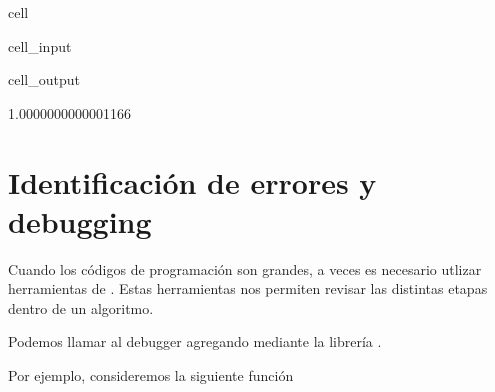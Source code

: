 \documentclass[letterpaper,10pt,english]{jupyterBook}
\begin{document}
\begin{sphinxuseclass}{cell}\begin{sphinxVerbatimInput}

\begin{sphinxuseclass}{cell_input}
\begin{sphinxVerbatim}[commandchars=\\\{\}]
 
\end{sphinxVerbatim}

\end{sphinxuseclass}\end{sphinxVerbatimInput}
\begin{sphinxVerbatimOutput}

\begin{sphinxuseclass}{cell_output}
\begin{sphinxVerbatim}[commandchars=\\\{\}]
1.0000000000001166
\end{sphinxVerbatim}

\end{sphinxuseclass}\end{sphinxVerbatimOutput}

\end{sphinxuseclass}

\section{Identificación de errores y debugging}
\label{\detokenize{1.1-Aspectos_generales/1.1-Aspectos_generales:identificacion-de-errores-y-debugging}}
\sphinxAtStartPar
Cuando los códigos de programación son grandes, a veces es necesario utlizar herramientas de . Estas herramientas nos permiten revisar las distintas etapas dentro de un algoritmo.

\sphinxAtStartPar
Podemos llamar al debugger agregando mediante la librería  .

\sphinxAtStartPar
Por ejemplo, consideremos la siguiente función
\end{document}
